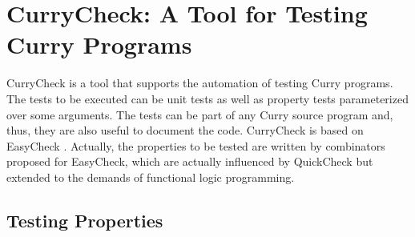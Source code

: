\section{CurryCheck: A Tool for Testing Curry Programs}
\label{sec-currycheck}

CurryCheck
is a tool that supports the automation of
testing Curry programs.
The tests to be executed can be unit tests as well as
property tests parameterized over some arguments.
The tests can be part of any Curry source program
and, thus, they are also useful to document the code.
CurryCheck is based on EasyCheck \cite{ChristiansenFischer08FLOPS}.
Actually, the properties to be tested are written
by combinators proposed for EasyCheck, which are actually
influenced by QuickCheck \cite{ClaessenHughes00}
but extended to the demands of functional logic programming.

\subsection{Testing Properties}

